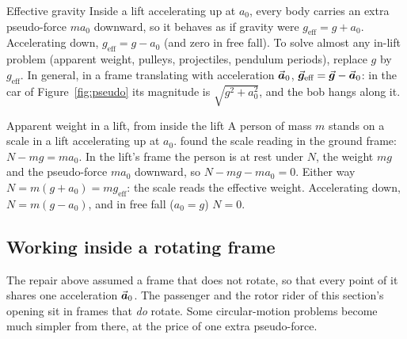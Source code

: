 \begin{keybox}{Effective gravity}
Inside a lift accelerating up at $a_0$, every body carries an extra pseudo-force $ma_0$ downward, so it
behaves as if gravity were $g_{\text{eff}}=g+a_0$. Accelerating down, $g_{\text{eff}}=g-a_0$ (and zero in
free fall). To solve almost any in-lift problem (apparent weight, pulleys, projectiles, pendulum
periods), replace $g$ by $g_{\text{eff}}$. In general, in a frame translating with acceleration $\vec{\bm{a}}_0$,
$\vec{\bm{g}}_{\text{eff}}=\vec{\bm{g}}-\vec{\bm{a}}_0$: in the car of Figure~\ref{fig:pseudo} its magnitude is
$\sqrt{g^{2}+a_0^{2}}$, and the bob hangs along it.
\end{keybox}

\begin{exbox}{Apparent weight in a lift, from inside the lift}
A person of mass $m$ stands on a scale in a lift accelerating up at $a_0$.  found the
scale reading in the ground frame: $N-mg=ma_0$. In the lift's frame the person is at rest under $N$, the
weight $mg$ and the pseudo-force $ma_0$ downward, so $N-mg-ma_0=0$. Either way $N=m(g+a_0)=mg_{\text{eff}}$:
the scale reads the effective weight. Accelerating down, $N=m(g-a_0)$, and in free fall ($a_0=g$)
$N=0$. 
\end{exbox}

\subsection{Working inside a rotating frame}\label{sub:rotframe}
The repair above assumed a frame that does not rotate, so that every point of it shares one acceleration
$\vec{\bm{a}}_0$. The passenger and the rotor rider of this section's opening sit in frames that \emph{do} rotate.
Some circular-motion problems become much simpler from there, at the price of one extra pseudo-force.

